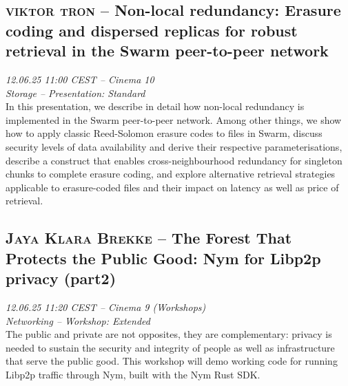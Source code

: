\clearpage
\subsection {\textsc{viktor tron}  -- Non-local redundancy: Erasure coding and dispersed replicas for robust retrieval in the Swarm peer-to-peer network} \noindent \textit {12.06.25 11:00 CEST -- Cinema 10\\ Storage -- Presentation: Standard}\\[1em] In this presentation, we describe in detail how non-local redundancy is implemented in the Swarm  peer-to-peer network. Among other things, we show how to apply classic Reed-Solomon erasure codes to files in Swarm, discuss security levels of data availability and derive their respective parameterisations, describe a construct that enables cross-neighbourhood redundancy for singleton chunks to complete erasure coding, and explore alternative retrieval strategies applicable to erasure-coded files and their impact on latency as well as price of retrieval.

\clearpage
\subsection {\textsc{Jaya Klara Brekke}  -- The Forest That Protects the Public Good: Nym for Libp2p privacy (part2)} \noindent \textit {12.06.25 11:20 CEST -- Cinema 9 (Workshops)\\ Networking -- Workshop: Extended}\\[1em] The public and private are not opposites, they are complementary: privacy is needed to sustain the security and integrity of people as well as infrastructure that serve the public good. This workshop will demo working code for running Libp2p traffic through Nym, built with the Nym Rust SDK.

\clearpage
